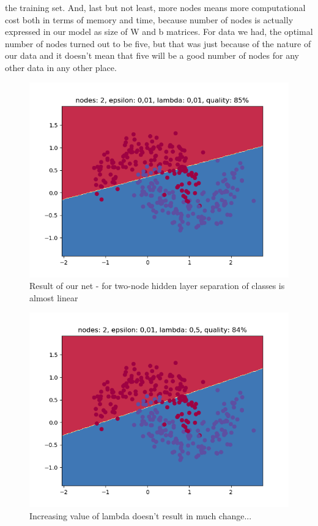 \documentclass[3p,twocolumn]{elsarticle}
\begin{document}
the training set. And, last but not least, more nodes means more computational cost both in terms of memory and time, because number of nodes is actually expressed in our model as size of W and b matrices. For data we had, the optimal number of nodes turned out to be five, but that was just because of the nature of our data and it doesn't mean that five will be a good number of nodes for any other data in any other place.



\begin{figure}[h!]
\label{fig:fig4}
  \includegraphics[width=\linewidth]{wykresy/1.png}
	\caption{Result of our net - for two-node hidden layer separation of classes is almost linear}
	\label{fig4}
\end{figure}

\begin{figure}[h!]
\label{fig:fig4}
  \includegraphics[width=\linewidth]{wykresy/2.png}
	\caption{Increasing value of lambda doesn't result in much change...}
	\label{fig4}
\end{figure}
\end{document}
